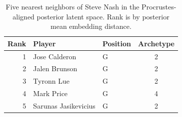 \begin{table}[htbp]
  \centering\small
  \begin{tabular}{rllc}
    \toprule
    Rank & Player & Position & Archetype \\
    \midrule
    1 & Jose Calderon & G & 2 \\
    2 & Jalen Brunson & G & 2 \\
    3 & Tyronn Lue & G & 2 \\
    4 & Mark Price & G & 4 \\
    5 & Sarunas Jasikevicius & G & 2 \\
    \bottomrule
  \end{tabular}
  \caption{Five nearest neighbors of Steve Nash in the Procrustes-aligned posterior latent space. Rank is by posterior mean embedding distance.}
  \label{tab:Steve_Nash_neighbors}
\end{table}

